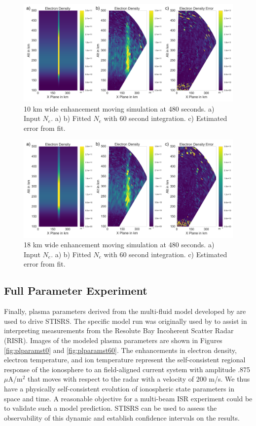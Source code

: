 \documentclass[draft,ras]{agutex}
\begin{document}
\begin{article}
\begin{figure}[!t]
\centering
\includegraphics[width=6in]{moving10kminouterr}
\caption{10 km wide enhancement moving simulation at 480 seconds. a) Input $N_e$. a)  b) Fitted $N_e$ with 60 second integration. c) Estimated error from fit.}
\label{fig:moving10all}
\end{figure}

\begin{figure}[!t]
\centering
\includegraphics[width=6in]{moving18kminouterr}
\caption{18 km wide enhancement moving simulation at 480 seconds. a) Input $N_e$. a)  b) Fitted $N_e$ with 60 second integration. c) Estimated error from fit.}
\label{fig:moving18all}
\end{figure}

\subsection{Full Parameter Experiment}
\label{sec:fullparam}
Finally, plasma parameters derived from the multi-fluid model developed by \cite{semeter:plasmatransport2012} are used to drive STISRS. The specific model run was originally used by \cite{Perry:2015jf} to assist in interpreting measurements from the Resolute Bay Incoherent Scatter Radar (RISR). Images of the modeled plasma parameters are shown in Figures \ref{fig:plparamst0} and \ref{fig:plparamst60}. The enhancements in electron density, electron temperature, and ion temperature represent the self-consistent regional response of the ionosphere to an field-aligned current system with amplitude .875 $\mu$A/m$^2$ that moves with respect to the radar with a velocity of 200 m/s.   We thus have a physically self-consistent evolution of ionospheric state parameters in space and time.   A reasonable objective for a multi-beam ISR experiment could be to validate such a model prediction.  STISRS can be used to assess the observability of this dynamic and establish confidence intervals on the results.  


\end{article}
\end{document}
